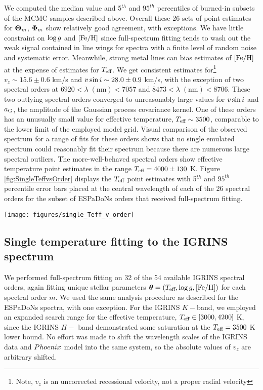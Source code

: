 \documentclass[twocolumn]{emulateapj}%
\begin{document}
We computed the median value and 5$^{th}$ and $95^{th}$ percentiles of burned-in subsets of the MCMC samples described above.  Overall these 26 sets of point estimates for ${\bm \Theta}_{m}$, ${\bm \Phi}_m$ show relatively good agreement, with exceptions.  We have little constraint on $\log g$ and $[{\rm Fe}/{\rm H}]$ since full-spectrum fitting tends to wash out the weak signal contained in line wings for spectra with a finite level of random noise and systematic error.  Meanwhile, strong metal lines can bias estimates of $[{\rm Fe}/{\rm H}]$ at the expense of estimates for $T_\textrm{eff}$.  We get consistent estimates for\footnote{Note, $v_z$ is an uncorrected recessional velocity, not a proper radial velocity} $v_z \sim 15.6 \pm 0.6$ km/s and $v \sin i \sim 28.0 \pm 0.9$ km/s, with the exception of two spectral orders at $6920 <\lambda \;(\mathrm{nm})< 7057$ and $8473 < \lambda \;(\mathrm{nm}) < 8706$.  These two outlying spectral orders converged to unreasonably large values for $v \sin i$ and $a_{\rm G}$, the amplitude of the Gaussian process covariance kernel.  One of these orders has an unusually small value for effective temperature, $T_\textrm{eff}\sim3500$, comparable to the lower limit of the employed model grid.  Visual comparison of the observed spectrum for a range of fits for these orders shows that no single emulated spectrum could reasonably fit their spectrum because there are numerous large spectral outliers.  The more-well-behaved spectral orders show effective temperature point estimates in the range $T_\textrm{eff}=4000\pm130$ K.  Figure \ref{fig:SingleTeffvsOrder} displays the $T_\textrm{eff}$ point estimates with 5$^{th}$ and $95^{th}$ percentile error bars placed at the central wavelength of each of the 26 spectral orders for the subset of ESPaDoNs orders that received full-spectrum fitting.  

\begin{figure*}
	\centering
	\texttt{[image: figures/single\_Teff\_v\_order]}
	\caption{Effective temperature as derived from unique full spectrum fitting to each of 58 spectral orders in the optical through infrared portions of the spectrum assuming a single component photosphere.  }
	\label{fig:SingleTeffvsOrder}
\end{figure*}

\subsection{Single temperature fitting to the IGRINS spectrum}

We performed full-spectrum fitting on 32 of the 54 available IGRINS spectral orders, again fitting unique stellar parameters ${\bm \theta} = (T_\textrm{eff}, \log g, [{\rm Fe}/{\rm H}])$ for each spectral order $m$.  We used the same analysis procedure as described for the ESPaDoNs spectra, with one exception.  For the IGRINS $K-$band, we employed an expanded search range for the effective temperature, $T_\textrm{eff} \in [3000, 4200]$ K, since the IGRINS $H-$ band demonstrated some saturation at the $T_\textrm{eff}=3500$ K lower bound.  No effort was made to shift the wavelength scales of the IGRINS data and ${\sc Phoenix}$ model into the same system, so the absolute values of $v_z$ are arbitrary shifted.
\end{document}
